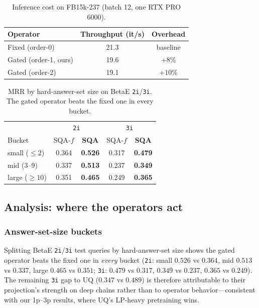\documentclass[journal]{IEEEtran}
\begin{document}
\begin{table}[t]
\centering
\caption{Inference cost on FB15k-237 (batch 12, one RTX PRO 6000).}
\label{tab:cost}
\small
\begin{tabular}{lcc}
\toprule
Operator & Throughput (it/s) & Overhead \\
\midrule
Fixed (order-0) & 21.3 & baseline \\
Gated (order-1, ours) & 19.6 & $+8\%$ \\
Gated (order-2) & 19.1 & $+10\%$ \\
\bottomrule
\end{tabular}
\end{table}


\begin{table}[t]
\centering
\caption{MRR by hard-answer-set size on BetaE \texttt{2i}/\texttt{3i}.
The gated operator beats the fixed one in every bucket.}
\label{tab:buckets}
\small
\begin{tabular}{lcccc}
\toprule
& \multicolumn{2}{c}{\texttt{2i}} & \multicolumn{2}{c}{\texttt{3i}} \\
Bucket & SQA-$f$ & \textbf{SQA} & SQA-$f$ & \textbf{SQA} \\
\midrule
small ($\leq 2$) & 0.364 & \textbf{0.526} & 0.317 & \textbf{0.479} \\
mid (3--9) & 0.337 & \textbf{0.513} & 0.237 & \textbf{0.349} \\
large ($\geq 10$) & 0.351 & \textbf{0.465} & 0.249 & \textbf{0.365} \\
\bottomrule
\end{tabular}
\end{table}


\subsection{Analysis: where the operators act}\label{sec:exp-analysis}

\subsubsection{Answer-set-size buckets} Splitting BetaE \texttt{2i}/\texttt{3i}
test queries by hard-answer-set size shows the gated operator beats the
fixed one in \emph{every} bucket (\texttt{2i}: small $0.526$ vs $0.364$,
mid $0.513$ vs $0.337$, large $0.465$ vs $0.351$; \texttt{3i}: $0.479$ vs
$0.317$, $0.349$ vs $0.237$, $0.365$ vs $0.249$). The remaining
\texttt{3i} gap to UQ ($0.347$ vs $0.489$) is therefore attributable to
their projection's strength on deep chains rather than to operator
behavior---consistent with our 1p--3p results, where UQ's LP-heavy
pretraining wins.
\end{document}
